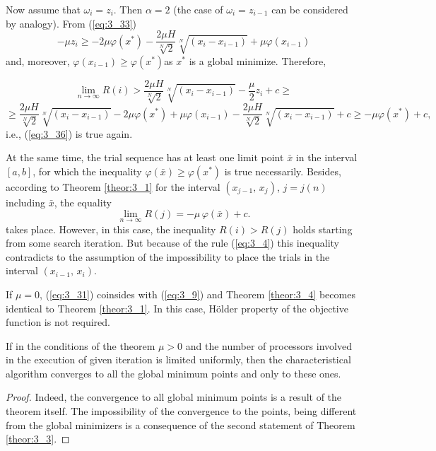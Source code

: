 	Now assume that $\omega _i =z_i $. Then $\alpha =2$ (the case of $\omega _i =z_{i-1} $ can be considered by analogy). From  (\ref{eq:3_33})
	\[-\mu z_i \ge -2\mu \varphi (x^{*} )-\frac{2\mu H}{\sqrt[{N}]{2} } \sqrt[{N}]{(x_{i} -x_{i-1} )} +\mu \varphi (x_{i-1} )\] 
	and, moreover, $\varphi (x_{i-1} )\ge \varphi (x^{*} )$as $x^{*} $ is a global minimize. Therefore,
	
	\begin{equation*}
	\mathop{\lim }\limits_{n\to \infty } R(i)>\frac{2\mu H}{\sqrt[{N}]{2} } \sqrt[{N}]{(x_{i} -x_{i-1} )} -\frac{\mu }{2} z_{i} +c\ge 
	\end{equation*}
	\begin{equation*}
	\ge \frac{2\mu H}{\sqrt[{N}]{2} } \sqrt[{N}]{(x_i -x_{i-1} )} -2\mu \varphi (x^{*} )+\mu \varphi (x_{i-1} )-\frac{2\mu H}{\sqrt[{N}]{2} } \sqrt[{N}]{(x_i -x_{i-1} )} +c\ge -\mu \varphi (x^{*} )+c,
	\end{equation*}
	i.e.,  (\ref{eq:3_36}) is true again.
	
	At the same time, the trial sequence has at least one limit point $\bar{x}$ in the interval $[a,b]$, for which the inequality $\varphi (\bar{x})\ge \varphi (x^{*} )$ is true necessarily. Besides, according to Theorem \ref{theor:3_1} for the interval $(x_{j-1} ,\, x_j )$, $j=j(n)$ including $\bar{x}$, the equality
	\begin{equation*}
	\mathop{\lim }\limits_{n\to \infty } R(j)=-\mu \, \varphi (\bar{x})+c.
	\end{equation*}
	takes place. However, in this case, the inequality $R(i)>R(j)$ holds starting from some search iteration. But because of the rule  (\ref{eq:3_4}) this inequality contradicts to the assumption of the impossibility to place the trials in the interval $(x_{i-1} ,\, x_i)$.
	
	\begin{corollary} If $\mu =0$,  (\ref{eq:3_31}) coinsides with  (\ref{eq:3_9}) and Theorem \ref{theor:3_4} becomes identical to Theorem \ref{theor:3_1}. In this case, H\"{o}lder property of the objective function is not required.
	\end{corollary}
	\begin{corollary} If in the conditions of the theorem $\mu >0$ and the number of processors involved in the execution of given iteration is limited uniformly, then the characteristical algorithm converges to all the global minimum points and only to these ones.
	\end{corollary}
	\begin{proof} Indeed, the convergence to all global minimum points is a result of the theorem itself. The impossibility of the convergence to the points, being different from the global minimizers is a consequence of the second statement of Theorem \ref{theor:3_3}.
	\end{proof}
	

